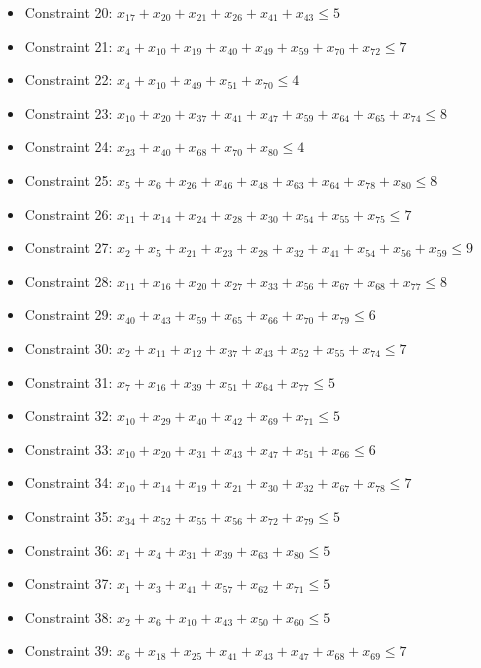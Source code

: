\documentclass[11pt]{article}
\begin{document}
\begin{itemize}
\item Constraint 20: $x_{17} + x_{20} + x_{21} + x_{26} + x_{41} + x_{43} \le 5$
\item Constraint 21: $x_{4} + x_{10} + x_{19} + x_{40} + x_{49} + x_{59} + x_{70} + x_{72} \le 7$
\item Constraint 22: $x_{4} + x_{10} + x_{49} + x_{51} + x_{70} \le 4$
\item Constraint 23: $x_{10} + x_{20} + x_{37} + x_{41} + x_{47} + x_{59} + x_{64} + x_{65} + x_{74} \le 8$
\item Constraint 24: $x_{23} + x_{40} + x_{68} + x_{70} + x_{80} \le 4$
\item Constraint 25: $x_{5} + x_{6} + x_{26} + x_{46} + x_{48} + x_{63} + x_{64} + x_{78} + x_{80} \le 8$
\item Constraint 26: $x_{11} + x_{14} + x_{24} + x_{28} + x_{30} + x_{54} + x_{55} + x_{75} \le 7$
\item Constraint 27: $x_{2} + x_{5} + x_{21} + x_{23} + x_{28} + x_{32} + x_{41} + x_{54} + x_{56} + x_{59} \le 9$
\item Constraint 28: $x_{11} + x_{16} + x_{20} + x_{27} + x_{33} + x_{56} + x_{67} + x_{68} + x_{77} \le 8$
\item Constraint 29: $x_{40} + x_{43} + x_{59} + x_{65} + x_{66} + x_{70} + x_{79} \le 6$
\item Constraint 30: $x_{2} + x_{11} + x_{12} + x_{37} + x_{43} + x_{52} + x_{55} + x_{74} \le 7$
\item Constraint 31: $x_{7} + x_{16} + x_{39} + x_{51} + x_{64} + x_{77} \le 5$
\item Constraint 32: $x_{10} + x_{29} + x_{40} + x_{42} + x_{69} + x_{71} \le 5$
\item Constraint 33: $x_{10} + x_{20} + x_{31} + x_{43} + x_{47} + x_{51} + x_{66} \le 6$
\item Constraint 34: $x_{10} + x_{14} + x_{19} + x_{21} + x_{30} + x_{32} + x_{67} + x_{78} \le 7$
\item Constraint 35: $x_{34} + x_{52} + x_{55} + x_{56} + x_{72} + x_{79} \le 5$
\item Constraint 36: $x_{1} + x_{4} + x_{31} + x_{39} + x_{63} + x_{80} \le 5$
\item Constraint 37: $x_{1} + x_{3} + x_{41} + x_{57} + x_{62} + x_{71} \le 5$
\item Constraint 38: $x_{2} + x_{6} + x_{10} + x_{43} + x_{50} + x_{60} \le 5$
\item Constraint 39: $x_{6} + x_{18} + x_{25} + x_{41} + x_{43} + x_{47} + x_{68} + x_{69} \le 7$

\end{itemize}
\end{document}

